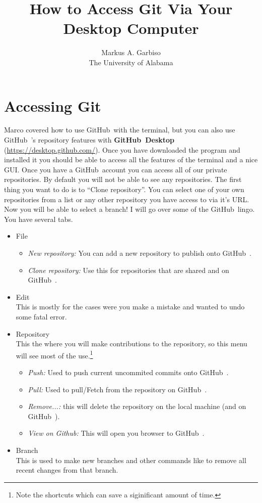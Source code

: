\documentclass{article}
\title{How to Access Git Via Your Desktop Computer} %
\author{Markus A. Garbiso \\ The University of Alabama} %
\newcommand{\gh}{GitHub~}
\begin{document}
\maketitle

\section{Accessing Git}

Marco covered how to use \gh with the terminal, but you can also use \gh's repository features with \textbf{\gh Desktop} (\href{https://desktop.github.com/}{https://desktop.github.com/}). Once you have downloaded the program and installed it you should be able to access all the features of the terminal and a nice GUI. Once you have a \gh account you can access all of our private repositories. By default you will not be able to see any repositories. The first thing you want to do is to ``Clone repository''.  You can select one of your own repositories from a list or any other repository you have access to via it's URL. Now you will be able to select a branch! I will go over some of the \gh lingo. You have several tabs.

\begin{itemize}
  \item File
  \begin{itemize}
  	\item \textit{New repository: } You can add a new repository to publish onto \gh.
  	\item \textit{Clone repository: } Use this for repositories that are shared and on \gh.
  \end{itemize}
  \item Edit\\This is mostly for the cases were you make a mistake and wanted to undo some fatal error.
  \item Repository\\This the where you will make contributions to the repository, so this menu will see most of the use.\footnote{Note the shortcuts which can save a siginificant amount of time.}
   \begin{itemize}
  	\item \textit{Push: } Used to push current uncommited commits onto \gh.
  	\item \textit{Pull: } Used to pull/Fetch from the repository on \gh.
  	\item \textit{Remove...: } this will delete the repository on the local machine (and on \gh).
  	\item \textit{View on Github: } This will open you browser to \gh.
  \end{itemize}
  \item Branch\\This is used to make new branches and other commands like to remove all recent changes from that branch.
\end{itemize}
\end{document}
